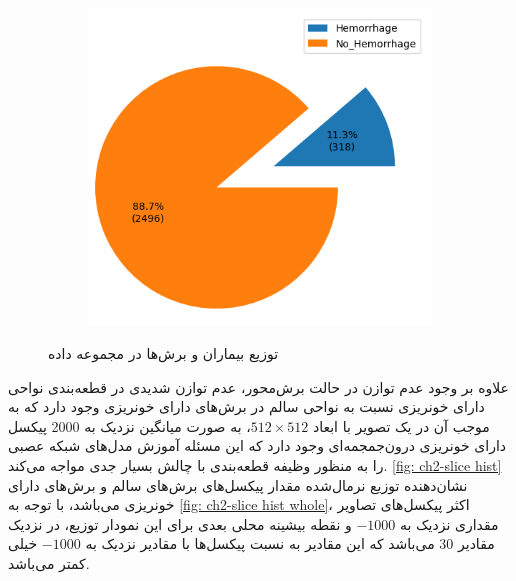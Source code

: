 \begin{figure}[ht]
\begin{subfigure}{0.45\textwidth}
			\includegraphics[width=\linewidth,]{Images/Chapter2/slice distribution.png}
			\caption{}
			\label{fig: ch2-slice distribution}
		\end{subfigure}
		\caption{توزیع بیماران و برش‌ها در مجموعه داده 
		}
		\label{fig: ch2-distribution}
\end{figure} 

 علاوه بر وجود عدم توازن در حالت برش‌محور، عدم توازن شدیدی در قطعه‌بندی نواحی دارای خونریزی نسبت به نواحی سالم در برش‌های دارای خونریزی وجود دارد که به موجب آن در یک تصویر با ابعاد
$512\times512$،
به صورت میانگین نزدیک به 2000 پیکسل
دارای خونریزی درون‌جمجمه‌ای وجود دارد که این مسئله آموزش مدل‌های شبکه عصبی را به منظور وظیفه قطعه‌بندی با چالش بسیار جدی مواجه می‌کند. 
\autoref{fig: ch2-slice hist}
نشان‌دهنده توزیع نرمال‌شده 
مقدار پیکسل‌های برش‌های سالم و برش‌های دارای خونریزی می‌باشد، با توجه به
\autoref{fig: ch2-slice hist whole}، 
اکثر پیکسل‌های تصاویر مقداری نزدیک به 
$-1000$
و نقطه بیشینه محلی بعدی برای این نمودار توزیع، در نزدیک مقادیر 30 می‌باشد که این مقادیر به نسبت پیکسل‌ها با مقادیر نزدیک به 
$-1000$
خیلی کمتر می‌باشد.


